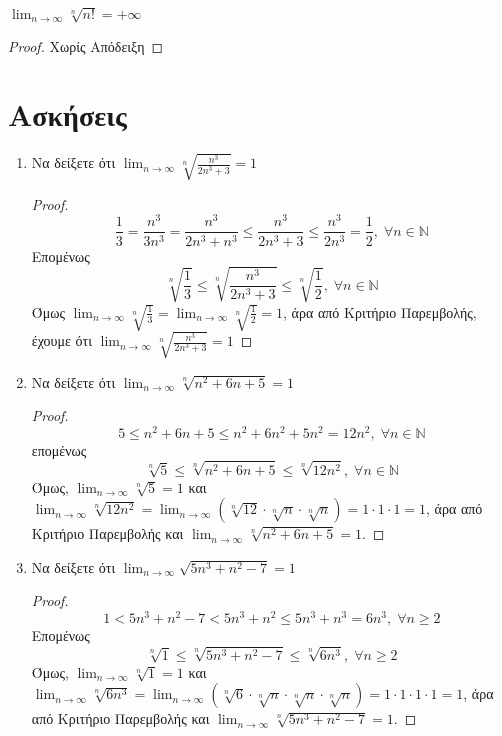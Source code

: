\documentclass[a4paper,table]{report}
\begin{document}
\begin{mybox3}
  \begin{prop}
    $ \lim_{n \to \infty} \sqrt[n]{n!} = +\infty $ 
  \end{prop}
\end{mybox3}
\begin{proof}
  Χωρίς Απόδειξη
\end{proof}

\section{Ασκήσεις}

\begin{enumerate}
    \item Να δείξετε ότι $ \lim_{n \to \infty} \sqrt[n]{\frac{n^{3}}{2n^{3}+3}} = 1$
      \begin{proof}
        \[
          \frac{1}{3} = \frac{n^{3}}{3n^{3}} = \frac{n^{3}}{2n^{3}+n^{3}} \leq 
          \frac{n^{3}}{2n^{3}+3} \leq \frac{n^{3}}{2n^{3}} = \frac{1}{2}, \; \forall n
          \in \mathbb{N}
        \] 
        Επομένως
        \[
          \sqrt[n]{\frac{1}{3}} \leq \sqrt[n]{\frac{n^{3}}{2n^{3}+3}} \leq
          \sqrt[n]{\frac{1}{2}}, \; \forall n \in \mathbb{N} 
        \] 
        Όμως $ \lim_{n \to \infty} \sqrt[n]{\frac{1}{3}} = \lim_{n \to \infty}
        \sqrt[n]{\frac{1}{2}} = 1 $, άρα από Κριτήριο Παρεμβολής, έχουμε ότι 
        $ \lim_{n \to \infty} \sqrt[n]{\frac{n^{3}}{2n^{3}+3}} = 1 $
      \end{proof}

    \item Να δείξετε ότι $ \lim_{n \to \infty} \sqrt[n]{n^{2}+6n+5} = 1 $
      \begin{proof}
        \[
          5 \leq n^{2}+6n+5 \leq n^{2}+6n^{2}+5n^{2}=12 n^{2}, \; \forall n \in
          \mathbb{N} 
         \] 
         επομένως
         \[
           \sqrt[n]{5} \leq \sqrt[n]{n^{2}+6n+5} \leq \sqrt[n]{12n^{2}} , \; \forall n
           \in \mathbb{N}
          \] 
          Όμως, $ \lim_{n \to \infty} \sqrt[n]{5} = 1 $ και $ \lim_{n \to \infty}
          \sqrt[n]{12n^{2}} = \lim_{n \to \infty} (\sqrt[n]{12} \cdot \sqrt[n]{n} \cdot
          \sqrt[n]{n})
          = 1 \cdot 1 \cdot 1 = 1  $, άρα από Κριτήριο Παρεμβολής και 
          $ \lim_{n \to \infty} \sqrt[n]{n^{2}+6n+5} = 1 $.
      \end{proof}

    \item Να δείξετε ότι $ \lim_{n \to \infty} \sqrt{5n^{3}+n^{2}-7} = 1 $
      \begin{proof}
        \[
          1< 5n^{3}+n^{2}-7 < 5n^{3}+n^{2} \leq 5n^{3}+n^{3} = 6n^{3}, 
          \; \forall n \geq 2
        \] 
        Επομένως
        \[
          \sqrt[n]{1} \leq \sqrt[n]{5n^{3}+n^{2}-7} \leq \sqrt[n]{6n^{3}} , \; \forall n
          \geq 2
        \]
        Όμως, $ \lim_{n \to \infty} \sqrt[n]{1} = 1 $ και $ \lim_{n \to \infty}
        \sqrt[n]{6n^{3}} = \lim_{n \to \infty} (\sqrt[n]{6} \cdot \sqrt[n]{n} \cdot
        \sqrt[n]{n} \cdot \sqrt[n]{n}) = 1 \cdot 1 \cdot 1 \cdot 1 = 1  $, 
        άρα από Κριτήριο Παρεμβολής και 
        $ \lim_{n \to \infty} \sqrt[n]{5n^{3}+n^{2}-7} = 1 $.
      \end{proof}


\end{enumerate}
\end{document}
